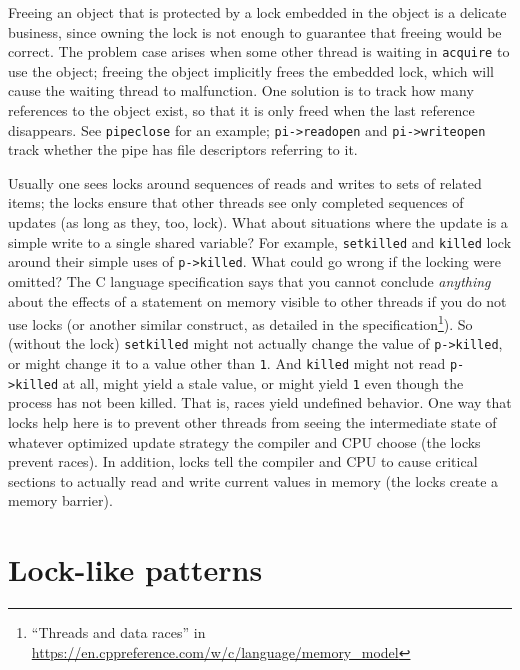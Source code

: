 Freeing an object that is protected by a lock embedded in the object
is a delicate business, since owning the lock is
not enough to guarantee that freeing would be correct. The problem
case arises when some other thread is waiting in {\tt acquire} to use
the object; freeing the object implicitly frees the embedded lock, which will
cause the waiting thread to malfunction. One solution is to track how
many references to the object exist, so that it is only freed when the
last reference disappears. See {\tt pipeclose}
 for an example;
{\tt pi->readopen} and {\tt pi->writeopen} track whether
the pipe has file descriptors referring to it.

Usually one sees locks around sequences of reads and writes to sets of related
items; the locks ensure that other threads see only completed sequences of
updates (as long as they, too, lock).
What about situations where the update is a simple write to a
single shared variable? For example, 
\texttt{setkilled} and \texttt{killed}
lock around their simple uses of
\lstinline{p->killed}.
What could go wrong if the locking were omitted?
The C language specification says that you
cannot conclude \textit{anything} about the effects of a
statement on memory visible to other threads if you do
not use locks (or another similar construct, as detailed in
the specification\footnote{``Threads and data races'' in \url{
https://en.cppreference.com/w/c/language/memory_model}}).
So (without the lock) \texttt{setkilled} might
not actually change the value of \lstinline{p->killed}, or
might change it to a value other than \texttt{1}. And \texttt{killed}
might not read \lstinline{p->killed} at all, might yield a stale
value, or might yield \texttt{1} even though the process has not been killed.
That is, races yield undefined behavior.
One way that locks help here is to
prevent other threads from seeing the intermediate state of whatever
optimized update strategy the compiler and CPU
choose (the locks prevent races).
In addition,
locks tell the compiler and CPU to 
cause critical sections to actually read and write current
values in memory (the locks create a memory barrier).


\section{Lock-like patterns}

